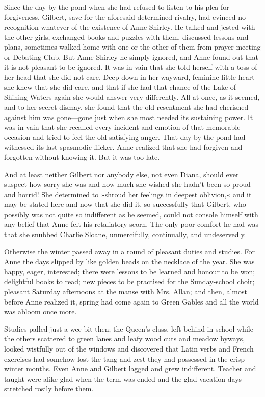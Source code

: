 Since the day by the pond when she had refused to listen to his plea for forgiveness, Gilbert, save for the aforesaid determined rivalry, had evinced no recognition whatever of the existence of Anne Shirley. He talked and jested with the other girls, exchanged books and puzzles with them, discussed lessons and plans, sometimes walked home with one or the other of them from prayer meeting or Debating Club. But Anne Shirley he simply ignored, and Anne found out that it is not pleasant to be ignored. It was in vain that she told herself with a toss of her head that she did not care. Deep down in her wayward, feminine little heart she knew that she did care, and that if she had that chance of the Lake of Shining Waters again she would answer very differently. All at once, as it seemed, and to her secret dismay, she found that the old resentment she had cherished against him was gone—gone just when she most needed its sustaining power. It was in vain that she recalled every incident and emotion of that memorable occasion and tried to feel the old satisfying anger. That day by the pond had witnessed its last spasmodic flicker. Anne realized that she had forgiven and forgotten without knowing it. But it was too late.

And at least neither Gilbert nor anybody else, not even Diana, should ever suspect how sorry she was and how much she wished she hadn't been so proud and horrid! She determined to »shroud her feelings in deepest oblivion,« and it may be stated here and now that she did it, so successfully that Gilbert, who possibly was not quite so indifferent as he seemed, could not console himself with any belief that Anne felt his retaliatory scorn. The only poor comfort he had was that she snubbed Charlie Sloane, unmercifully, continually, and undeservedly.

Otherwise the winter passed away in a round of pleasant duties and studies. For Anne the days slipped by like golden beads on the necklace of the year. She was happy, eager, interested; there were lessons to be learned and honour to be won; delightful books to read; new pieces to be practised for the Sunday-school choir; pleasant Saturday afternoons at the manse with Mrs. Allan; and then, almost before Anne realized it, spring had come again to Green Gables and all the world was abloom once more.

Studies palled just a wee bit then; the Queen's class, left behind in school while the others scattered to green lanes and leafy wood cuts and meadow byways, looked wistfully out of the windows and discovered that Latin verbs and French exercises had somehow lost the tang and zest they had possessed in the crisp winter months. Even Anne and Gilbert lagged and grew indifferent. Teacher and taught were alike glad when the term was ended and the glad vacation days stretched rosily before them.


